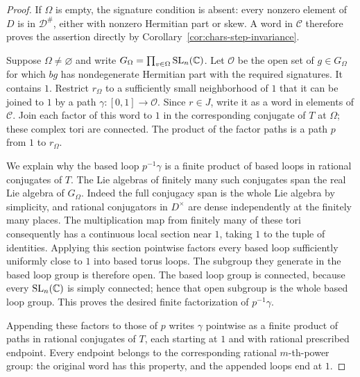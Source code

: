 \begin{proof}
If $\Omega$ is empty, the signature condition is absent: every nonzero
element of $D$ is in $\mathcal D^\#$, either with nonzero Hermitian
part or skew. A word in $\mathcal C$ therefore proves the assertion
directly by Corollary~\ref{cor:chars-step-invariance}.

Suppose $\Omega\ne\varnothing$ and write
$G_\Omega=\prod_{v\in\Omega}\operatorname{SL}_n(\mathbb C)$. Let $\mathcal O$
be the open set of $g\in G_\Omega$ for which $bg$ has nondegenerate
Hermitian part with the required signatures. It contains $1$. Restrict
$r_\Omega$ to a sufficiently small neighborhood of $1$ that it can be
joined to $1$ by a path $\gamma:[0,1]\to\mathcal O$.
Since $r\in J$, write it as a word in elements of $\mathcal C$.
Join each factor of this word to $1$ in the corresponding conjugate of
$T$ at $\Omega$; these complex tori are connected. The product of the
factor paths is a path $p$ from $1$ to $r_\Omega$.

We explain why the based loop $p^{-1}\gamma$ is a finite product of
based loops in rational conjugates of $T$. The Lie algebras of finitely
many such conjugates span the real Lie algebra of $G_\Omega$.
Indeed the full conjugacy span is the whole Lie algebra by simplicity,
and rational conjugators in $D^\times$ are dense independently at the
finitely many places. The multiplication map from finitely many of
these tori consequently has a continuous local section near $1$, taking
$1$ to the tuple of identities. Applying this section pointwise factors
every based loop sufficiently uniformly close to $1$ into based torus
loops. The subgroup they generate in the based loop group is therefore
open. The based loop group is connected, because every
$\operatorname{SL}_n(\mathbb C)$ is simply connected; hence that open subgroup is
the whole based loop group. This proves the desired finite
factorization of $p^{-1}\gamma$.

Appending these factors to those of $p$ writes $\gamma$ pointwise as
a finite product of paths in rational conjugates of $T$, each starting
at $1$ and with rational prescribed endpoint. Every endpoint belongs
to the corresponding rational $m$-th-power group: the original word
has this property, and the appended loops end at $1$.


\end{proof}
